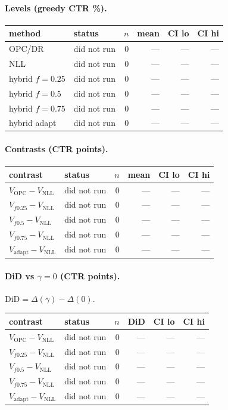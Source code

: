 \documentclass[10pt,a4paper]{article}
\begin{document}
\paragraph{Levels (greedy CTR \%).}
{\centering\small\begin{tabular}{llrrrr}
\toprule method & status & $n$ & mean & CI lo & CI hi \\
\midrule
OPC/DR & did not run & 0 & --- & --- & --- \\
NLL & did not run & 0 & --- & --- & --- \\
hybrid $f{=}0.25$ & did not run & 0 & --- & --- & --- \\
hybrid $f{=}0.5$ & did not run & 0 & --- & --- & --- \\
hybrid $f{=}0.75$ & did not run & 0 & --- & --- & --- \\
hybrid adapt & did not run & 0 & --- & --- & --- \\
\bottomrule\end{tabular}\par}
\paragraph{Contrasts (CTR points).}
{\centering\small\begin{tabular}{llrrrr}
\toprule contrast & status & $n$ & mean & CI lo & CI hi \\
\midrule
$V_{\mathrm{OPC}}-V_{\mathrm{NLL}}$ & did not run & 0 & --- & --- & --- \\
$V_{f0.25}-V_{\mathrm{NLL}}$ & did not run & 0 & --- & --- & --- \\
$V_{f0.5}-V_{\mathrm{NLL}}$ & did not run & 0 & --- & --- & --- \\
$V_{f0.75}-V_{\mathrm{NLL}}$ & did not run & 0 & --- & --- & --- \\
$V_{\mathrm{adapt}}-V_{\mathrm{NLL}}$ & did not run & 0 & --- & --- & --- \\
\bottomrule\end{tabular}\par}
\paragraph{DiD vs $\gamma=0$ (CTR points).} $\mathrm{DiD}=\Delta(\gamma)-\Delta(0)$.
{\centering\small\begin{tabular}{llrrrr}
\toprule contrast & status & $n$ & DiD & CI lo & CI hi \\
\midrule
$V_{\mathrm{OPC}}-V_{\mathrm{NLL}}$ & did not run & 0 & --- & --- & --- \\
$V_{f0.25}-V_{\mathrm{NLL}}$ & did not run & 0 & --- & --- & --- \\
$V_{f0.5}-V_{\mathrm{NLL}}$ & did not run & 0 & --- & --- & --- \\
$V_{f0.75}-V_{\mathrm{NLL}}$ & did not run & 0 & --- & --- & --- \\
$V_{\mathrm{adapt}}-V_{\mathrm{NLL}}$ & did not run & 0 & --- & --- & --- \\
\bottomrule\end{tabular}\par}
\bigskip
\newpage
\end{document}
